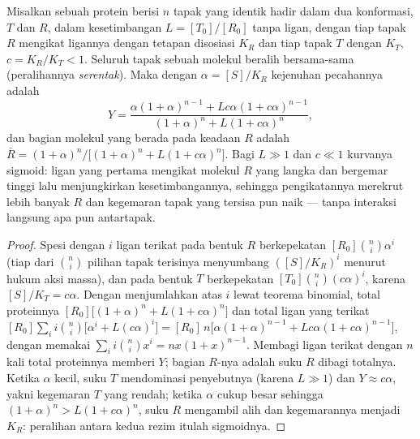 \begin{theorem}\label{thm:b3:structural-biology:mwc}
Misalkan sebuah protein berisi $n$ tapak yang identik hadir dalam dua
konformasi, $T$ dan $R$, dalam kesetimbangan $L = [T_{0}]/[R_{0}]$ tanpa
ligan, dengan tiap tapak $R$ mengikat ligannya dengan tetapan disosiasi
$K_{R}$ dan tiap tapak $T$ dengan $K_{T}$, $c = K_{R}/K_{T} < 1$. Seluruh
tapak sebuah molekul beralih bersama-sama (peralihannya
\emph{serentak}). Maka dengan $\alpha = [S]/K_{R}$ kejenuhan pecahannya adalah
\[
Y = \frac{\alpha(1+\alpha)^{n-1} + Lc\alpha(1+c\alpha)^{n-1}}
{(1+\alpha)^{n} + L(1+c\alpha)^{n}},
\]
dan bagian molekul yang berada pada keadaan $R$ adalah $\bar R =
(1+\alpha)^{n}/\bigl[(1+\alpha)^{n} + L(1+c\alpha)^{n}\bigr]$. Bagi $L
\gg 1$ dan $c \ll 1$ kurvanya sigmoid: ligan yang pertama mengikat molekul $R$
yang langka dan bergemar tinggi lalu menjungkirkan kesetimbangannya, sehingga
pengikatannya merekrut lebih banyak $R$ dan kegemaran tapak yang tersisa pun
naik ---  tanpa interaksi langsung apa pun antartapak.
\end{theorem}
\begin{proof}
Spesi dengan $i$ ligan terikat pada bentuk $R$ berkepekatan
$[R_{0}]\binom{n}{i}\alpha^{i}$ (tiap dari $\binom{n}{i}$ pilihan tapak
terisinya menyumbang $([S]/K_{R})^{i}$ menurut hukum aksi massa), dan pada
bentuk $T$ berkepekatan $[T_{0}]\binom{n}{i}(c\alpha)^{i}$, karena
$[S]/K_{T} = c\alpha$. Dengan menjumlahkan atas $i$ lewat teorema binomial,
total proteinnya $[R_{0}]\bigl[(1+\alpha)^{n} + L(1+c\alpha)^{n}\bigr]$
dan total ligan yang terikat $[R_{0}]\sum_{i} i\binom{n}{i}\bigl[
\alpha^{i} + L(c\alpha)^{i}\bigr] = [R_{0}]\,n\bigl[\alpha(1+\alpha)^{n-1}
+ Lc\alpha(1+c\alpha)^{n-1}\bigr]$, dengan memakai $\sum_{i} i\binom{n}{i}x^{i} =
nx(1+x)^{n-1}$. Membagi ligan terikat dengan $n$ kali total proteinnya memberi
$Y$; bagian $R$-nya adalah suku $R$ dibagi totalnya. Ketika $\alpha$
kecil, suku $T$ mendominasi penyebutnya (karena $L \gg 1$) dan
$Y \approx c\alpha$, yakni kegemaran $T$ yang rendah; ketika $\alpha$ cukup besar
sehingga $(1+\alpha)^{n} > L(1+c\alpha)^{n}$, suku $R$ mengambil alih dan
kegemarannya menjadi $K_{R}$: peralihan antara kedua rezim itulah sigmoidnya.
\end{proof}

